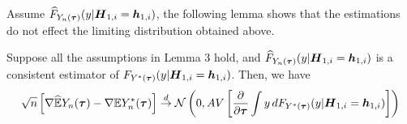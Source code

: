 \documentclass[../main.tex]{subfiles}
\begin{document}
Assume $\widehat{F}_{Y_n(\boldsymbol{\tau})}(y | \boldsymbol{H}_{1,i} = \boldsymbol{h}_{1,i})$, the following lemma shows that the estimations do not effect the limiting distribution obtained above.
\begin{corollary}
Suppose all the assumptions in Lemma 3  hold, and $\widehat{F}_{Y_n(\boldsymbol{\tau})}(y | \boldsymbol{H}_{1,i} = \boldsymbol{h}_{1,i})$ is a consistent estimator of ${F}_{Y^*(\boldsymbol{\tau})}(y | \boldsymbol{H}_{1,i} = \boldsymbol{h}_{1,i})$. Then, we have
\begin{gather}
\begin{flalign*}
\sqrt{n}\lt[\nabla \wh{\mb{E}} Y_n(\bs{\tau})  - \nabla \mb{E}Y^*_n(\bs{\tau})\rt]\overset{d}{\to}\mathcal{N}\lt(0,AV\lt[\pard[\bs{\tau}] \int y \,d  F_{Y^*(\bs{\tau})}(y | \bs{H}_{1,i} = \bs{h}_{1,i}) \rt]\rt)
\end{flalign*}
\end{gather}
\end{corollary}
\end{document}
